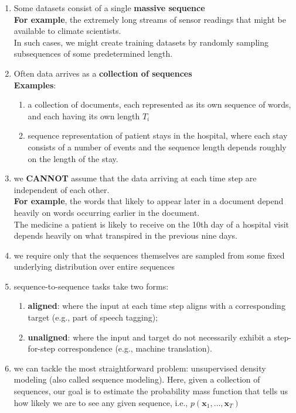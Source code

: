 \begin{enumerate}[itemsep=0.15cm]
    \item Some datasets consist of a single \textbf{massive sequence}\\
    \textbf{For example}, the extremely long streams of sensor readings that might be available to climate scientists.\\
    In such cases, we might create training datasets by randomly sampling subsequences of some predetermined length.

    \item Often data arrives as a \textbf{collection of sequences}\\
    \textbf{Examples}:
    \begin{enumerate}
        \item a collection of documents, each represented as its own sequence of words, and each having its own length $T_i$
        
        \item sequence representation of patient stays in the hospital, where each stay consists of a number of events and the sequence length depends roughly on the length of the stay.
        
    \end{enumerate}

    \item we \textbf{CANNOT} assume that the data arriving at each time step are independent of each other.\\
    \textbf{For example}, the words that likely to appear later in a document depend heavily on words occurring earlier in the document.\\
    The medicine a patient is likely to receive on the 10th day of a hospital visit depends heavily on what transpired in the previous nine days.

    \item we require only that the sequences themselves are sampled from some fixed underlying distribution over entire sequences

    \item sequence-to-sequence tasks take two forms: 
    \begin{enumerate}
        \item \textbf{aligned}: where the input at each time step aligns with a corresponding target (e.g., part of speech tagging); 
        
        \item \textbf{unaligned}: where the input and target do not necessarily exhibit a step-for-step correspondence (e.g., machine translation).
    \end{enumerate}

    \item we can tackle the most straightforward problem: unsupervised density modeling (also called sequence modeling). Here, given a collection of sequences, our goal is to estimate the probability mass function that tells us how likely we are to see any given sequence, i.e., $p(\mathbf{x}_1, \ldots, \mathbf{x}_T)$

\end{enumerate}


